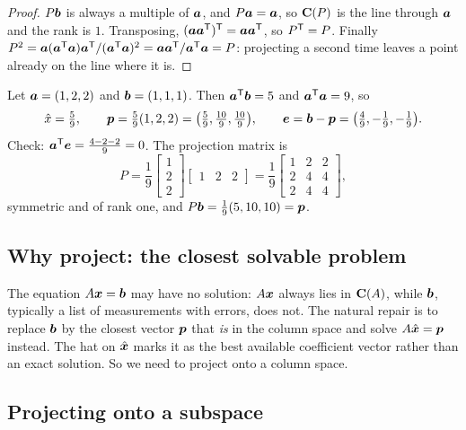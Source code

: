 \begin{proof}
$P\boldsymbol{b}$ is always a multiple of $\boldsymbol{a}$, and $P\boldsymbol{a}=\boldsymbol{a}$, so $\mathbf{C}(P)$ is the line
through $\boldsymbol{a}$ and the rank is $1$. Transposing, $(\boldsymbol{a}\boldsymbol{a}^{\mathsf{T}})^{\mathsf{T}}=\boldsymbol{a}\boldsymbol{a}^{\mathsf{T}}$, so
$P^{\mathsf{T}}=P$. Finally
$P^2=\boldsymbol{a}(\boldsymbol{a}^{\mathsf{T}}\boldsymbol{a})\boldsymbol{a}^{\mathsf{T}}/(\boldsymbol{a}^{\mathsf{T}}\boldsymbol{a})^2=\boldsymbol{a}\boldsymbol{a}^{\mathsf{T}}/\boldsymbol{a}^{\mathsf{T}}\boldsymbol{a}=P$:
projecting a second time leaves a point already on the line where it is.
\end{proof}

\begin{example}\label{ex:u17-line}
Let $\boldsymbol{a}=(1,2,2)$ and $\boldsymbol{b}=(1,1,1)$. Then $\boldsymbol{a}^{\mathsf{T}}\boldsymbol{b}=5$ and $\boldsymbol{a}^{\mathsf{T}}\boldsymbol{a}=9$, so
\[
  \hat{x}=\tfrac{5}{9},\qquad
  \boldsymbol{p}=\tfrac{5}{9}(1,2,2)=\bigl(\tfrac59,\tfrac{10}9,\tfrac{10}9\bigr),\qquad
  \boldsymbol{e}=\boldsymbol{b}-\boldsymbol{p}=\bigl(\tfrac49,-\tfrac19,-\tfrac19\bigr).
\]
Check: $\boldsymbol{a}^{\mathsf{T}}\boldsymbol{e}=\frac{4-2-2}{9}=0$. The projection matrix is
\[
  P=\frac{1}{9}\begin{bmatrix}1\\2\\2\end{bmatrix}\begin{bmatrix}1&2&2\end{bmatrix}
   =\frac{1}{9}\begin{bmatrix}1&2&2\\2&4&4\\2&4&4\end{bmatrix},
\]
symmetric and of rank one, and $P\boldsymbol{b}=\frac19(5,10,10)=\boldsymbol{p}$.
\end{example}

\subsection{Why project: the closest solvable problem}

The equation $A\boldsymbol{x}=\boldsymbol{b}$ may have no solution: $A\boldsymbol{x}$ always lies in $\mathbf{C}(A)$, while
$\boldsymbol{b}$, typically a list of measurements with errors, does not. The natural repair is to
replace $\boldsymbol{b}$ by the closest vector $\boldsymbol{p}$ that \emph{is} in the column space and solve
$A\hat{\boldsymbol{x}}=\boldsymbol{p}$ instead. The hat on $\hat{\boldsymbol{x}}$ marks it as the best available
coefficient vector rather than an exact solution. So we need to project onto a column space.

\subsection{Projecting onto a subspace}

